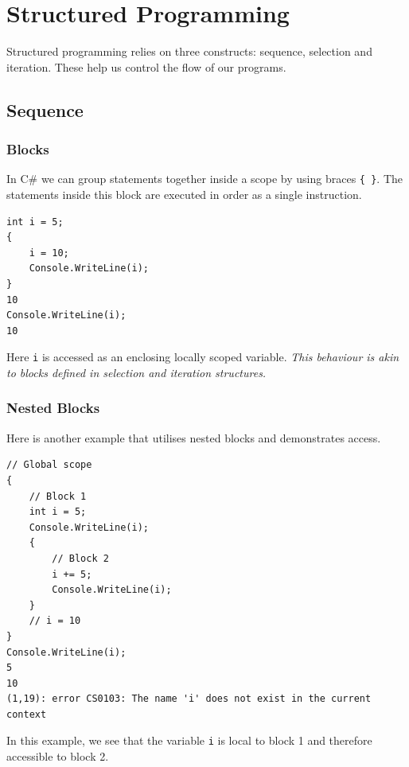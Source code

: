 \documentclass{article}
\def\customlinemarker#1#2{
    \edef\thelstnumber{%
        \unexpanded{%
            \ifnum#1=\value{lstnumber}\relax
              #2%
            \fi}%
        \ifx\thelstnumber\relax\else
        \expandafter\unexpanded\expandafter{\thelstnumber}%
        \fi
    }
}
\begin{document}
\section{Structured Programming}
Structured programming relies on three constructs: sequence, selection and iteration.
These help us control the flow of our programs.
\subsection{Sequence}
\subsubsection{Blocks}
In C\# we can group statements together inside a scope by using braces \lstinline!{ }!.
The statements inside this block are executed in order as a single instruction.
\begingroup
\let\thelstnumber\relax
\customlinemarker{1}{\$}
\customlinemarker{2}{.}
\customlinemarker{3}{.}
\customlinemarker{4}{.}
\customlinemarker{5}{.}
\customlinemarker{7}{\$}
\begin{lstlisting}
int i = 5;
{
    i = 10;
    Console.WriteLine(i);
}
10
Console.WriteLine(i);
10
\end{lstlisting}
\endgroup
Here \lstinline{i} is accessed as an enclosing locally scoped variable.
\emph{This behaviour is akin to blocks defined in selection and iteration structures.}
\subsubsection{Nested Blocks}
Here is another example that utilises nested blocks and demonstrates access.

\begingroup
\let\thelstnumber\relax
\customlinemarker{1}{\$}
\customlinemarker{2}{\$}
\customlinemarker{3}{.}
\customlinemarker{4}{.}
\customlinemarker{5}{.}
\customlinemarker{6}{.}
\customlinemarker{7}{.}
\customlinemarker{8}{.}
\customlinemarker{9}{.}
\customlinemarker{10}{.}
\customlinemarker{11}{.}
\customlinemarker{12}{.}
\customlinemarker{13}{\$}
\begin{lstlisting}
// Global scope    
{
    // Block 1     
    int i = 5;  
    Console.WriteLine(i);
    {
        // Block 2
        i += 5;
        Console.WriteLine(i);
    }
    // i = 10
}
Console.WriteLine(i);
5
10
(1,19): error CS0103: The name 'i' does not exist in the current context
\end{lstlisting}
\endgroup
In this example, we see that the variable \lstinline{i} is local to block 1 and therefore accessible to block 2.
\end{document}
